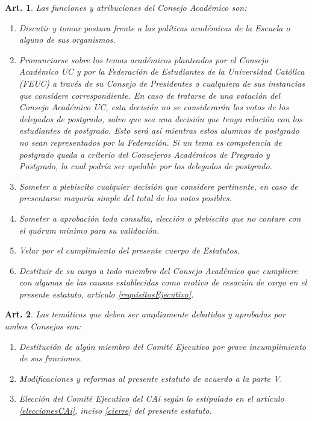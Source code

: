 \documentclass[letterpaper,11pt]{article}
\theoremstyle{plain}
\newtheorem{art}{Art.} %
\begin{document}
		\begin{art}\label{funcionesConsejoAcademico}
			Las funciones y atribuciones del Consejo Académico son:
			\begin{enumerate}
				\item Discutir y tomar postura frente a las políticas académicas de la Escuela o alguno de sus organismos.
				\item Pronunciarse sobre los temas académicos planteados por el Consejo Académico UC y por la Federación de Estudiantes de la Universidad Católica (FEUC) a través de su Consejo de Presidentes o cualquiera de sus instancias que considere correspondiente. En caso de tratarse de
				una votación del Consejo Académico UC, esta decisión no se considerarán los votos de los delegados de postgrado, salvo que sea una decisión que tenga relación con los estudiantes de postgrado. Esto será así mientras estos alumnos de postgrado no sean representados por la Federación. Si un tema es competencia de postgrado queda a criterio del Consejeros Académicos de Pregrado y Postgrado, la cual podría ser apelable por los delegados de postgrado.
				\item Someter a plebiscito cualquier decisión que considere pertinente, en caso de presentarse mayoría simple del total de los votos posibles.
				\item Someter a aprobación toda consulta, elección o plebiscito que no contare con el quórum mínimo para su validación.
				\item Velar por el cumplimiento del presente cuerpo de Estatutos.
				\item Destituir de su cargo a todo miembro del Consejo Académico que cumpliere con algunas de las causas establecidas como motivo de cesación de cargo en el presente estatuto, artículo \ref{requisitosEjecutivo}.
			\end{enumerate}
		\end{art}

		\begin{art}
			Las temáticas que deben ser ampliamente debatidas y aprobadas por ambos Consejos son:
			\begin{enumerate}
				\item Destitución de algún miembro del Comité Ejecutivo por grave incumplimiento de sus funciones.
				\item Modificaciones y reformas al presente estatuto de acuerdo a la parte V.
				\item Elección del Comité Ejecutivo del CAi según lo estipulado en el artículo \ref{eleccionesCAi}, inciso \ref{cierre} del presente estatuto.
			\end{enumerate}
		\end{art}
\end{document}
